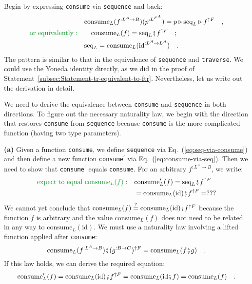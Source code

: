 Begin by expressing \lstinline!consume! via \lstinline!sequence!
and back:
\begin{align}
 & \text{consume}_{L}(f^{:L^{A}\rightarrow B})(p^{:L^{F^{A}}})=p\triangleright\text{seq}_{L}\triangleright f^{\uparrow F}\quad,\nonumber \\
{\color{greenunder}\text{or equivalently}:}\quad & \quad\text{consume}_{L}(f)=\text{seq}_{L}\bef f^{\uparrow F}\quad;\label{eq:consume-via-seq}\\
 & \text{seq}_{L}=\text{consume}_{L}(\text{id}^{:L^{A}\rightarrow L^{A}})\quad.\label{eq:seq-via-consume}
\end{align}
The pattern is similar to that in the equivalence of \lstinline!sequence!
and \lstinline!traverse!. We could use the Yoneda identity directly,
as we did in the proof of Statement~\ref{subsec:Statement-tr-equivalent-to-ftr}.
Nevertheless, let us write out the derivation in detail.

We need to derive the equivalence between \lstinline!consume! and
\lstinline!sequence! in both directions. To figure out the necessary
naturality law, we begin with the direction that restores \lstinline!consume!
from \lstinline!sequence! because \lstinline!consume! is the more
complicated function (having two type parameters).

\textbf{(a)} Given a function \lstinline!consume!, we define \lstinline!sequence!
via Eq.~(\ref{eq:seq-via-consume}) and then define a new function
\lstinline!consume!$^{\prime}$ via Eq.~(\ref{eq:consume-via-seq}).
Then we need to show that \lstinline!consume!$^{\prime}$ equals
\lstinline!consume!. For an arbitrary $f^{:L^{A}\rightarrow B}$,
we write:
\begin{align*}
{\color{greenunder}\text{expect to equal }\text{consume}_{L}(f):}\quad & \text{consume}_{L}^{\prime}(f)=\text{seq}_{L}\bef f^{\uparrow F}\\
 & =\text{consume}_{L}(\text{id})\bef f^{\uparrow F}=???
\end{align*}
We cannot yet conclude that $\text{consume}_{L}(f)\overset{?}{=}\text{consume}_{L}(\text{id})\bef f^{\uparrow F}$
because the function $f$ is arbitrary and the value $\text{consume}_{L}(f)$
does not need to be related in any way to $\text{consume}_{L}(\text{id})$.
We must use a naturality law involving a lifted function applied after
\lstinline!consume!:
\begin{equation}
\text{consume}_{L}(f^{:L^{A}\rightarrow B})\bef(g^{:B\rightarrow C})^{\uparrow F}=\text{consume}_{L}(f\bef g)\quad.\label{eq:consume-naturality-law}
\end{equation}
If this law holds, we can derive the required equation:
\[
\text{consume}_{L}^{\prime}(f)=\text{consume}_{L}(\text{id})\bef f^{\uparrow F}=\text{consume}_{L}(\text{id}\bef f)=\text{consume}_{L}(f)\quad.
\]

